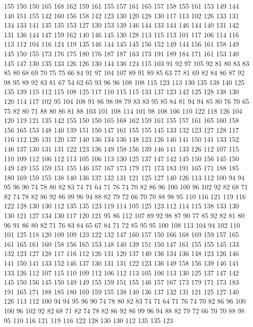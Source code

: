 155 150 150 165 168 162 159 161 155 157 161 165 157 158 155 161 153 149 144 140
151 155 142 160 156 158 142 123 130 120 128 130 117 113 102 126 133 131 134 133
141 135 135 153 127 130 153 139 146 144 133 144 146 144 140 131 142 131 136 144
147 159 162 140 146 145 130 128 113 115 113 101 117 106 114 116 113 112 104 116
124 119 135 146 144 145 145 156 152 149 144 156 161 158 149 145 150 155 173 176
175 180 176 187 187 163 173 191 189 184 171 161 153 140 145 147 130 135 133 126
126 130 144 136 124 115 103 91 92 97 105 92 81 80 83 83 85 80 68 69
70 75 75 66 84 91 97 104 107 89 91 89 85 63 77 81 69 82 84 86
87 92 98 95 89 92 83 81 67 54 62 65 93 96 96 108 108 115 123 113
130 135 138 140 125 135 139 115 112 115 108 125 117 110 115 115 133 137 123 142
125 128 138 130 120 114 117 102 95 104 108 91 86 98 98 79 83 83 95 85
84 81 94 94 85 80 76 70 65 75 82 80 71 88 80 86 81 88 103 101
108 114 101 98 108 106 110 122 118 126 104 120 119 121 135 142 155 150 150 165
168 162 159 161 155 157 161 165 160 158 156 165 153 148 140 139 151 150 147 161
155 155 145 133 132 123 127 128 117 116 112 126 131 120 137 140 136 134 136 148
123 126 146 141 150 141 133 152 146 137 130 131 131 122 123 136 149 158 156 139
146 141 133 126 112 107 115 110 109 112 106 112 113 105 106 113 130 125 137 147
142 145 150 156 145 150 149 149 155 159 151 155 146 157 167 173 179 171 173 183
191 165 171 188 185 180 169 159 155 138 140 136 137 132 131 121 125 127 140 126
113 112 100 94 94 95 96 90 74 78 80 82 83 74 71 64 71 76 74 70
82 86 96 100 100 96 102 92 82 68 71 82 74 78 82 86 92 86 99 96
94 88 82 79 72 66 70 70 88 98 95 110 116 121 119 116 122 128 130 130
112 135 135 123 119 114 105 125 123 112 114 115 138 133 130 130 121 127 134 130
117 120 121 95 86 112 107 89 92 98 87 90 77 85 92 82 81 80 96 91
86 80 82 71 76 83 84 65 67 84 71 72 85 95 95 100 108 113 104 94
102 110 101 125 118 120 109 109 123 122 132 147 160 157 150 166 168 169 159 157
165 161 165 161 160 158 156 165 153 148 140 139 151 150 147 161 155 155 145 133
132 123 127 128 117 116 112 126 131 120 137 140 136 134 136 148 123 126 146 141
150 141 133 152 146 137 130 131 131 122 123 136 149 158 156 139 146 141 133 126
112 107 115 110 109 112 106 112 113 105 106 113 130 125 137 147 142 145 150 156
145 150 149 149 155 159 151 155 146 157 167 173 179 171 173 183 191 165 171 188
185 180 169 159 155 138 140 136 137 132 131 121 125 127 140 126 113 112 100 94
94 95 96 90 74 78 80 82 83 74 71 64 71 76 74 70 82 86 96 100
100 96 102 92 82 68 71 82 74 78 82 86 92 86 99 96 94 88 82 79
72 66 70 70 88 98 95 110 116 121 119 116 122 128 130 130 112 135 135 123
